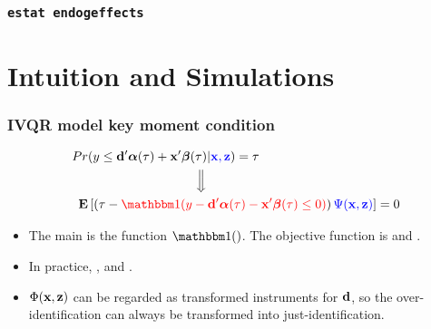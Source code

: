 \documentclass[11pt]{beamer}
\begin{document}
\begin{frame}
  \frametitle{{\tt estat endogeffects}}
\end{frame}


\section{Intuition and Simulations}
\begin{frame}
  \frametitle{IVQR model key moment condition}
  \begin{align*}
    Pr&(y \leq \db'\alphab(\tau)  + \xb'\betab(\tau)|\myblue{\xb, \zb}) 
    = \tau
    \\
    & \hskip 3cm \Big\Downarrow  \\
    \E& \left[
      \left( \tau - \myred{\I(y - \db'\alphab(\tau)  - \xb'\betab(\tau) \leq 0)}
      \right)
    \myblue{\Psi(\xb, \zb)} \right]  = 0
  \end{align*}

  \begin{itemize}
    \setlength\itemsep{1em}
    \item The main  is the  function $\I()$.
      The objective function is  and .

    \item In practice, , and
      .

    \item $\Phi(\mathbf{x}, \mathbf{z})$ can be regarded as transformed instruments for $\mathbf{d}$,
      so the over-identification can always be transformed into
      just-identification.
  \end{itemize}
\end{frame}
\end{document}
